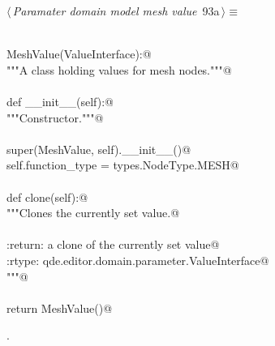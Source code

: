 \documentclass[
    a4paper,      %
    10pt,         %
    openright,    %
    notitlepage,  %
    parskip=half, %
]{scrreprt}       %
\theoremstyle{definition}                    %
\begin{document}
\begin{flushleft} \small
\begin{minipage}{\linewidth}\label{scrap152}\raggedright\small
{} $\langle\,${\itshape Paramater domain model mesh value}\nobreak\ {\footnotesize {93a}}$\,\rangle\equiv$
\vspace{-1exm}
\begin{list}{}{} \item
\mbox{}\lstinline@@\\
\mbox{}\lstinline@class MeshValue(ValueInterface):@\\
\mbox{}\lstinline@    """A class holding values for mesh nodes."""@\\
\mbox{}\lstinline@@\\
\mbox{}\lstinline@    def __init__(self):@\\
\mbox{}\lstinline@        """Constructor."""@\\
\mbox{}\lstinline@@\\
\mbox{}\lstinline@        super(MeshValue, self).__init__()@\\
\mbox{}\lstinline@        self.function_type = types.NodeType.MESH@\\
\mbox{}\lstinline@@\\
\mbox{}\lstinline@    def clone(self):@\\
\mbox{}\lstinline@        """Clones the currently set value.@\\
\mbox{}\lstinline@@\\
\mbox{}\lstinline@        :return: a clone of the currently set value@\\
\mbox{}\lstinline@        :rtype:  qde.editor.domain.parameter.ValueInterface@\\
\mbox{}\lstinline@        """@\\
\mbox{}\lstinline@@\\
\mbox{}\lstinline@        return MeshValue()@{\NWsep}
\end{list}
\vspace{-1.5ex}
\footnotesize
\begin{list}{}{\setlength{\itemsep}{-\parsep}\setlength{\itemindent}{-\leftmargin}}
\item {\NWtxtMacroNoRef}.

\item{}
\end{list}
\end{minipage}\vspace{4ex}
\end{flushleft}
\end{document}
